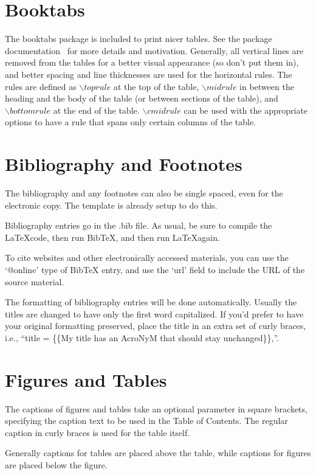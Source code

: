 \section{Booktabs}
The booktabs package is included to print nicer tables. See the package documentation~\cite{fear2005booktabs} for more details and motivation. Generally, all vertical lines are removed from the tables for a better visual appearance (so don't put them in), and better spacing and line thicknesses are used for the horizontal rules. The rules are defined as $\backslash toprule$ at the top of the table, $\backslash midrule$ in between the heading and the body of the table (or between sections of the table), and $\backslash bottomrule$ at the end of the table. $\backslash cmidrule$ can be used with the appropriate options to have a rule that spans only certain columns of the table.

\section{Bibliography and Footnotes}

The bibliography and any footnotes can also be single spaced, even for the electronic copy. The template is already setup to do this.

Bibliography entries go in the .bib file. As usual, be sure to compile the \LaTeX code, then run BibTeX, and then run \LaTeX again.

To cite websites and other electronically accessed materials, you can use the `@online' type of BibTeX entry, and use the `url' field to include the URL of the source material.

The formatting of bibliography entries will be done automatically. Usually the titles are changed to have only the first word capitalized. If you'd prefer to have your original formatting preserved, place the title in an extra set of curly braces, i.e., ``title = \{\{My title has an AcroNyM that should stay unchanged\}\},''.

\section{Figures and Tables}
The captions of figures and tables take an optional parameter in square brackets, specifying the caption text to be used in the Table of Contents. The regular caption in curly braces is used for the table itself.

Generally captions for tables are placed above the table, while captions for figures are placed below the figure.



